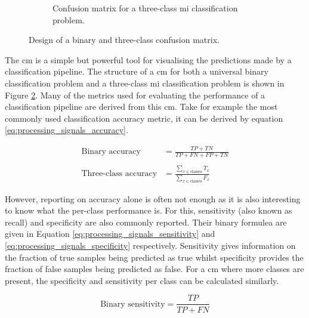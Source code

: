 \begin{figure}[t]
\begin{subfigure}{0.45\textwidth}
        \captionsetup{width=\linewidth}
        \captionsetup{justification=centering}
        \caption{Confusion matrix for a three-class \gls{mi} classification problem.}
        \label{fig:processing_signals_cm_three}
    \end{subfigure}
    \captionsetup{width=\linewidth}
    \captionsetup{justification=centering}
    \caption{Design of a binary and three-class confusion matrix.}
    \label{fig:processing_signals_cm}
\end{figure}

The \gls{cm} is a simple but powerful tool for visualising the predictions made by a classification pipeline.
The structure of a \gls{cm} for both a universal binary classification problem and a three-class \gls{mi} classification problem is shown in Figure \ref{fig:processing_signals_cm}.
Many of the metrics used for evaluating the performance of a classification pipeline are derived from this \gls{cm}.
Take for example the most commonly used classification accuracy metric, it can be derived by equation \ref{eq:processing_signals_accuracy}.

\begin{equation}
    \begin{aligned} 
        \text{Binary accuracy} &= \frac{TP + TN}{TP + FN + FP + TN} \\\\
        \text{Three-class accuracy} &= \frac{\sum\limits_{x \in \text{classes}} T_x}{\sum\limits_{x \in \text{classes}} F_x}
    \end{aligned}
    \label{eq:processing_signals_accuracy}
\end{equation}

However, reporting on accuracy alone is often not enough as it is also interesting to know what the per-class performance is.
For this, sensitivity (also known as recall) and specificity are also commonly reported.
Their binary formulea are given in Equation \ref{eq:processing_signals_sensitivity} and \ref{eq:processing_signals_specificity} respectively.
Sensitivity gives information on the fraction of true samples being predicted as true whilst specificity provides the fraction of false samples being predicted as false.
For a \gls{cm} where more classes are present, the specificity and sensitivity per class can be calculated similarly.

\begin{equation} %
    \text{Binary sensitivity} = \frac{TP}{TP + FN}
    \label{eq:processing_signals_sensitivity}
\end{equation}

